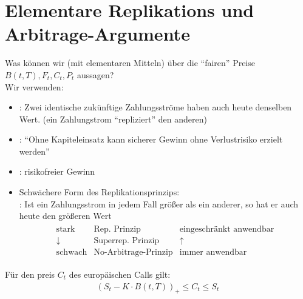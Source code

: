 \section{Elementare Replikations und Arbitrage-Argumente}
Was können wir (mit elementaren Mitteln) über die ``fairen'' Preise $B(t,T), F_t, C_t, P_t$ aussagen?\\
Wir verwenden:
\begin{itemize}
	\item {}: Zwei identische zukünftige Zahlungsströme haben auch heute denselben Wert. (ein Zahlungstrom ``repliziert'' den anderen) %
	\item {}: ``Ohne Kapiteleinsatz kann sicherer Gewinn ohne Verlustrisiko erzielt werden''
	\item {}: risikofreier Gewinn\\
	\item Schwächere Form des Replikationsprinzips:\\
	: Ist ein Zahlungsstrom in jedem Fall größer als ein anderer, so hat er auch heute den größeren Wert
	\begin{align*}
		\begin{matrix}
			\text{stark} & \text{Rep. Prinzip} & \text{eingeschränkt anwendbar}\\
			\downarrow & \text{Superrep. Prinzip} & \uparrow\\
			\text{schwach} & \text{No-Arbitrage-Prinzip} & \text{immer anwendbar}
		\end{matrix}
	\end{align*}
\end{itemize}
\begin{lemma} %
	Für den preis $C_t$ des europäischen Calls gilt:
	\begin{align*}
		(S_t - K\cdot B(t,T))_+ \le C_t \le S_t
	\end{align*}
\end{lemma}
